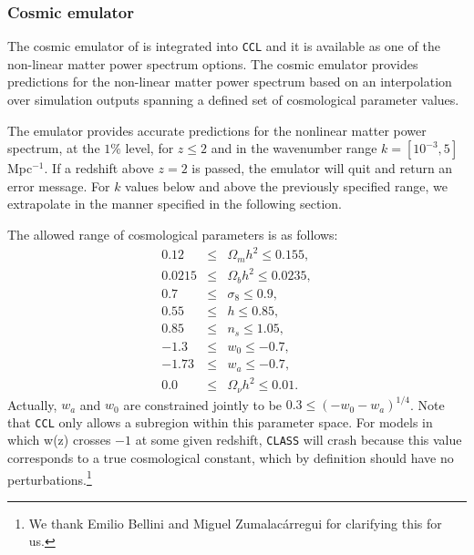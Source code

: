 \documentclass[\docopts]{\docclass}
\newcommand{\ccl}{{\tt CCL}\xspace}
\begin{document}
\subsubsection{Cosmic emulator}

The cosmic emulator of \citet{Lawrence17} is integrated into \ccl and it is available as one of the non-linear matter power spectrum
options. The cosmic emulator provides predictions for the non-linear matter power spectrum based on an
interpolation over simulation outputs spanning a defined set of cosmological parameter values.

The emulator provides accurate predictions for the nonlinear matter power spectrum, at the $1\%$ level,
for $z\leq 2$ and in the wavenumber range $k=[10^{-3},5]$ Mpc$^{-1}$. If a redshift above $z=2$ is passed,
the emulator will quit and return an error message. For $k$ values below and above the previously
specified range, we extrapolate in the manner specified in the following section.

The allowed range of cosmological parameters is as follows:
\begin{eqnarray}
0.12&\leq& \Omega_m h^2 \leq 0.155,\nonumber\\
0.0215&\leq& \Omega_b h^2 \leq 0.0235,\nonumber\\
0.7&\leq& \sigma_8 \leq 0.9,\nonumber\\
0.55&\leq& h \leq 0.85,\nonumber\\
0.85&\leq& n_s\leq 1.05,\nonumber\\
-1.3&\leq& w_0\leq-0.7,\nonumber\\
-1.73&\leq& w_a\leq -0.7,\nonumber\\
0.0&\leq& \Omega_\nu h^2 \leq 0.01.
\end{eqnarray}
Actually, $w_a$ and $w_0$ are constrained jointly to be $0.3\leq (-w_0-w_a)^{1/4}$. Note that \ccl
only allows a subregion within this parameter space. For models in which w(z) crosses $-1$ at some
given redshift, {\tt CLASS} will crash because this value corresponds to a true cosmological
constant, which by definition should have no perturbations.\footnote{We thank Emilio Bellini and 
Miguel Zumalac\'arregui for clarifying this for us.}
\end{document}
